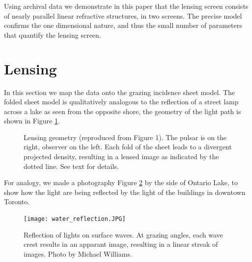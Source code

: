 \documentclass[useAMS,usenatbib]{mn2e}
\begin{document}
Using archival data we demonstrate in this paper that the lensing screen
consists of nearly parallel linear refractive structures, in two
screens.  The precise model confirms the one dimensional nature, and
thus the small number of parameters that
quantify the lensing screen. 





\section{Lensing}

In this section we map the data onto the grazing incidence sheet
model.  The folded sheet model is qualitatively analogous to the
reflection of a street lamp across a lake as seen from the opposite
shore, the geometry of the light path is shown in Figure \ref{fig:sheetgeom}.

\begin{figure}
\vspace{-0.5in}
\centerline{}
\vspace{-6in}
\caption{Lensing geometry (reproduced from \citet{2014MNRAS.442.3338P}
  Figure 1).  The pulsar is on the right, observer on the left.  Each
  fold of the sheet leads to a divergent projected density, resulting
  in a lensed image as indicated by the dotted line. See text for details.
}
\label{fig:sheetgeom}
\end{figure}

For analogy, we made a photography Figure \ref{fig:water_reflection} by the side of Ontario Lake, to show how the light are being reflected by the light of the buildings in downtown Toronto.

\begin{figure}
\centering
\texttt{[image: water\_reflection.JPG]}
\caption{Reflection of lights on surface waves.  At grazing angles,
  each wave crest results in an apparant image, resulting in a linear
  streak of images.
Photo by Michael Williams.}
\label{fig:water_reflection}
\end{figure}
\end{document}
